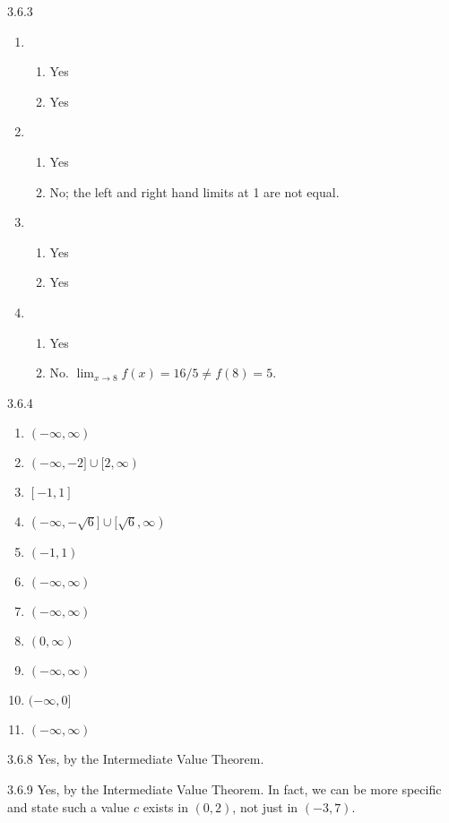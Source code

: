 \begin{Answer}{3.6.3}
\begin{enumerate}
\item {\begin{enumerate}
\item		Yes
\item		Yes
\end{enumerate}
}
\item {\begin{enumerate}
\item		Yes
\item		No; the left and right hand limits at 1 are not equal.
\end{enumerate}
}
\item {\begin{enumerate}
\item		Yes
\item		Yes
\end{enumerate}
}
\item {\begin{enumerate}
\item		Yes
\item		No. $\lim_{x\to 8} f(x) = 16/5 \neq f(8) = 5$.
\end{enumerate}
}
\end{enumerate}
\end{Answer}
\begin{Answer}{3.6.4}
\begin{enumerate}
\item {$(-\infty,\infty)$
}
\item {$(-\infty,-2]\cup [2,\infty)$
}
\item {$[-1,1]$
}
\item {$(-\infty,-\sqrt{6}]\cup [\sqrt{6},\infty)$
}
\item {$(-1,1)$
}
\item {$(-\infty,\infty)$
}
\item {$(-\infty,\infty)$
}
\item {$(0,\infty)$
}
\item {$(-\infty,\infty)$
}
\item
{$(-\infty,0]$
}
\item
{$(-\infty,\infty)$
}
\end{enumerate}
\end{Answer}
\begin{Answer}{3.6.8}
{Yes, by the Intermediate Value Theorem.
}
\end{Answer}
\begin{Answer}{3.6.9}
  {Yes, by the Intermediate Value Theorem. In fact, we can be more specific and state such a value $c$ exists in $(0,2)$, not just in $(-3,7)$.
  }
\end{Answer}
